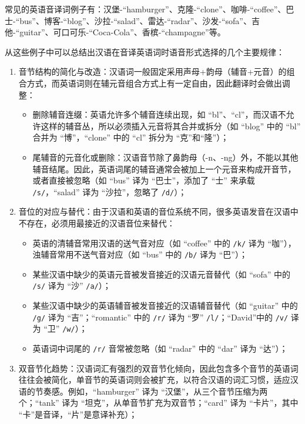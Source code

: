 \documentclass[10pt]{ctexart}
\begin{document}
\vspace{0.5cm}  

常见的英语音译词例子有：汉堡-``hamburger''、克隆-``clone''、咖啡-``coffee''、巴士-``bus''、博客-``blog''、沙拉-``salad''、雷达-``radar''、沙发-``sofa''、吉他-``guitar''、可口可乐-``Coca-Cola''、香槟-``champagne''等。

从这些例子中可以总结出汉语在音译英语词时语音形式选择的几个主要规律：
\begin{enumerate}
    \item 音节结构的简化与改造：汉语词一般固定采用声母+韵母（辅音+元音）的组合方式，而英语词则在辅元音组合方式上有一定自由，因此翻译时会做出调整：
    \begin{itemize}     
        \item 删除辅音连缀：英语允许多个辅音连续出现，如 ``bl''、``cl''，而汉语不允许这样的辅音丛，所以必须插入元音将其合并或拆分（如 ``blog'' 中的 ``bl'' 合并为 ``博''，``clone'' 中的 ``cl'' 拆分为 ``克''和``隆''）；
        \item 尾辅音的元音化或删除：汉语音节除了鼻韵母（-n、-ng）外，不能以其他辅音结尾。因此，英语词尾的辅音通常会被加上一个元音来构成开音节，或者直接被忽略（如 ``bus'' 译为 ``巴士''，添加了 ``士'' 来承载 \texttt{/s/}，``salad'' 译为 ``沙拉''，忽略了 \texttt{/d/}）；
    \end{itemize}
    
    \item 音位的对应与替代：由于汉语和英语的音位系统不同，很多英语发音在汉语中不存在，必须用最接近的汉语音位来替代：
    \begin{itemize}
        \item 英语的清辅音常用汉语的送气音对应（如 ``coffee'' 中的 \texttt{/k/} 译为 ``咖''），浊辅音常用不送气音对应（如 ``bus'' 中的 \texttt{/b/} 译为 ``巴''）；
        \item 某些汉语中缺少的英语元音被发音接近的汉语元音替代（如 ``sofa'' 中的 \texttt{/s\textschwa\textupsilon/} 译为 ``沙'' \texttt{/\textrtails a/}）；
        \item 某些汉语中缺少的英语辅音被发音接近的汉语辅音替代（如 ``guitar'' 中的 \texttt{/g\textsci/} 译为 ``吉''；``romantic'' 中的 \texttt{/r/} 译为 ``罗'' \texttt{/l/}；``David''中的 \texttt{/v/} 译为 ``卫'' \texttt{/w/}）；
         \item 英语词中词尾的 \texttt{/r/} 音常被忽略（如 ``radar'' 中的 ``dar'' 译为 ``达''）；
    \end{itemize}
    
    \item 双音节化趋势：汉语词汇有强烈的双音节化倾向，因此包含多个音节的英语词往往会被简化，单音节的英语词则会被扩充，以符合汉语的词汇习惯，适应汉语的节奏感。例如，``hamburger'' 译为 ``汉堡''，从三个音节压缩为两个；``tank'' 译为 ``坦克''，从单音节扩充为双音节；``card'' 译为 ``卡片''，其中 ``卡''是音译，``片''是意译补充）；
    

\end{enumerate}
\end{document}
